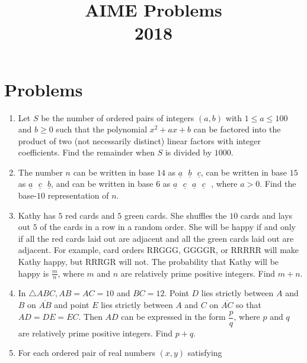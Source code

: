 \documentclass{article}
\title{AIME Problems \\ 2018}
\date{}
\begin{document}
\maketitle\thispagestyle{fancy}\newpage\section*{Problems}\begin{enumerate}[label=\arabic*., itemsep=0.5em]\item Let $S$ be the number of ordered pairs of integers $(a,b)$ with $1 \leq a \leq 100$ and $b \geq 0$ such that the polynomial $x^2+ax+b$ can be factored into the product of two (not necessarily distinct) linear factors with integer coefficients. Find the remainder when $S$ is divided by $1000$.\par \vspace{0.5em}\item The number $n$ can be written in base $14$ as $\underline{a}\text{ }\underline{b}\text{ }\underline{c}$, can be written in base $15$ as $\underline{a}\text{ }\underline{c}\text{ }\underline{b}$, and can be written in base $6$ as $\underline{a}\text{ }\underline{c}\text{ }\underline{a}\text{ }\underline{c}\text{ }$, where $a > 0$. Find the base-$10$ representation of $n$.\par \vspace{0.5em}\item Kathy has $5$ red cards and $5$ green cards. She shuffles the $10$ cards and lays out $5$ of the cards in a row in a random order. She will be happy if and only if all the red cards laid out are adjacent and all the green cards laid out are adjacent. For example, card orders RRGGG, GGGGR, or RRRRR will make Kathy happy, but RRRGR will not. The probability that Kathy will be happy is $ \frac{m}{n}$, where $m$ and $n$ are relatively prime positive integers. Find $m + n$.\par \vspace{0.5em}\item In $\triangle ABC, AB = AC = 10$ and $BC = 12$. Point $D$ lies strictly between $A$ and $B$ on $\overline{AB}$ and point $E$ lies strictly between $A$ and $C$ on $\overline{AC}$ so that $AD = DE = EC$. Then $AD$ can be expressed in the form $\dfrac{p}{q}$, where $p$ and $q$ are relatively prime positive integers. Find $p+q$.\par \vspace{0.5em}\item For each ordered pair of real numbers $(x,y)$ satisfying


\end{enumerate}
\end{document}
